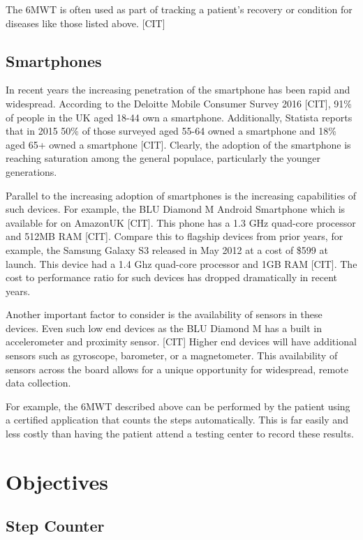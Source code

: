             The 6MWT is often used as part of tracking a patient's recovery or condition for diseases like those listed above. [CIT]

        \section{Smartphones}

            In recent years the increasing penetration of the smartphone has been rapid and widespread. According to the Deloitte Mobile Consumer Survey 2016 [CIT], 91\% of people in the UK aged 18-44 own a smartphone. Additionally, Statista reports that in 2015 50\% of those surveyed aged 55-64 owned a smartphone and 18\% aged 65+ owned a smartphone [CIT]. Clearly, the adoption of the smartphone is reaching saturation among the general populace, particularly the younger generations.

            Parallel to the increasing adoption of smartphones is the increasing capabilities of such devices. For example, the BLU Diamond M Android Smartphone which is available for  on AmazonUK [CIT]. This phone has a 1.3 GHz quad-core processor and 512MB RAM [CIT]. Compare this to flagship devices from prior years, for example, the Samsung Galaxy S3 released in May 2012 at a cost of \$599 at launch. This device had a 1.4 Ghz quad-core processor and 1GB RAM [CIT]. The cost to performance ratio for such devices has dropped dramatically in recent years.

            Another important factor to consider is the availability of sensors in these devices. Even such low end devices as the BLU Diamond M has a built in accelerometer and proximity sensor. [CIT] Higher end devices will have additional sensors such as gyroscope, barometer, or a magnetometer. This availability of sensors across the board allows for a unique opportunity for widespread, remote data collection. 

            For example, the 6MWT described above can be performed by the patient using a certified application that counts the steps automatically. This is far easily and less costly than having the patient attend a testing center to record these results. 

    \chapter{Objectives}

        \section{Step Counter}

